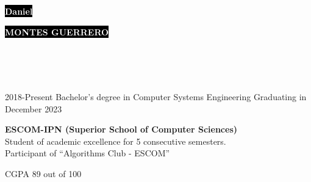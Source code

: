 \documentclass[9pt]{developercv} %
\begin{document}

\begin{minipage}[t]{0.70\textwidth} %
	\vspace{-\baselineskip} %
	
	\colorbox{black}{{\HUGE\textcolor{white}{\textbf{{Daniel}}}}} %
	
	\colorbox{black}{{\HUGE\textcolor{white}{\textbf{{MONTES GUERRERO}}}}} %
	
	\vspace{6pt}
\end{minipage}
\begin{minipage}[t]{0.3\textwidth} %
	\vspace{-\baselineskip} %
	
	\\
	\\
	\\
\end{minipage}


\vspace{0.5cm}



\begin{entrylist}
	\entry
		{2018-Present}
		{Bachelor’s degree in Computer Systems Engineering}
		{Graduating in December 2023}
		{\textbf{ESCOM-IPN (Superior School of Computer Sciences)}\\
		Student of academic excellence for 5 consecutive semesters.\\
		Participant of ``Algorithms Club - ESCOM''
		 \begin{flushright}
		 	CGPA 89 out of 100
		 \end{flushright}
		}
\end{entrylist}
\end{document}
